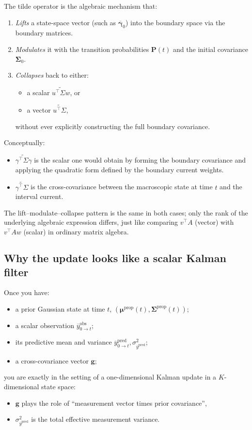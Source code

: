 \documentclass[11pt]{article}
\begin{document}
The tilde operator is the algebraic mechanism that:
\begin{enumerate}
  \item \emph{Lifts} a state-space vector (such as \(\overline{\boldsymbol{\gamma}}_0\)) into the boundary space via the boundary matrices.
  \item \emph{Modulates} it with the transition probabilities \(\mathbf{P}(t)\) and the initial covariance \(\boldsymbol{\Sigma}_0\).
  \item \emph{Collapses} back to either:
    \begin{itemize}
      \item a scalar \(\widetilde{u^{\top}\Sigma w}\), or
      \item a vector \(\widetilde{u^{\top}\Sigma}\),
    \end{itemize}
    without ever explicitly constructing the full boundary covariance.
\end{enumerate}

Conceptually:
\begin{itemize}
  \item \(\widetilde{\gamma^{\top}\Sigma\gamma}\) is the scalar one would obtain by forming the boundary covariance and applying the quadratic form defined by the boundary current weights.
  \item \(\widetilde{\gamma^{\top}\Sigma}\) is the cross-covariance between the macroscopic state at time \(t\) and the interval current.
\end{itemize}
The lift--modulate--collapse pattern is the same in both cases; only the rank of the underlying algebraic expression differs, just like comparing \(v^{\top} A\) (vector) with \(v^{\top}Aw\) (scalar) in ordinary matrix algebra.

\subsection{Why the update looks like a scalar Kalman filter}

Once you have:
\begin{itemize}
  \item a prior Gaussian state at time \(t\),
  \((\boldsymbol{\mu}^{\text{prop}}(t),\boldsymbol{\Sigma}^{\text{prop}}(t))\);
  \item a scalar observation \(\overline{y}^{\text{obs}}_{0\to t}\);
  \item its predictive mean and variance
  \(\overline{y}^{\text{pred}}_{0\to t},\sigma^2_{\overline{y}^{\text{pred}}}\);
  \item a cross-covariance vector \(\mathbf{g}\);
\end{itemize}
you are exactly in the setting of a one-dimensional Kalman update in a \(K\)-dimensional state space:
\begin{itemize}
  \item \(\mathbf{g}\) plays the role of ``measurement vector times prior covariance'',
  \item \(\sigma^2_{\overline{y}^{\text{pred}}}\) is the total effective measurement variance.
\end{itemize}
\end{document}
